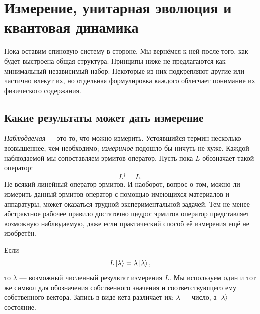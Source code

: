 \chapter{Измерение, унитарная эволюция и квантовая динамика}


Пока оставим спиновую систему в стороне. Мы вернёмся к ней после того, как будет выстроена общая структура. Принципы ниже не предлагаются как минимальный независимый набор. Некоторые из них подкрепляют другие или частично влекут их, но отдельная формулировка каждого облегчает понимание их физического содержания.

\section{Какие результаты может дать измерение}

\emph{Наблюдаемая} — это то, что можно измерить. Устоявшийся термин несколько возвышеннее, чем необходимо; \emph{измеримое} подошло бы ничуть не хуже. Каждой наблюдаемой мы сопоставляем эрмитов оператор. Пусть пока \(L\) обозначает такой оператор:
\begin{equation}
L^\dagger=L.
\end{equation}
Не всякий линейный оператор эрмитов. И наоборот, вопрос о том, можно ли измерить данный эрмитов оператор с помощью имеющихся материалов и аппаратуры, может оказаться трудной экспериментальной задачей. Тем не менее абстрактное рабочее правило достаточно щедро: эрмитов оператор представляет возможную наблюдаемую, даже если практический способ её измерения ещё не изобретён.

Если
\begin{equation}
L\left\lvert\lambda\right\rangle=\lambda\left\lvert\lambda\right\rangle,
\end{equation}
то \(\lambda\) — возможный численный результат измерения \(L\). Мы используем один и тот же символ для обозначения собственного значения и соответствующего ему собственного вектора. Запись в виде кета различает их: \(\lambda\) — число, а \(\left\lvert\lambda\right\rangle\) — состояние.

